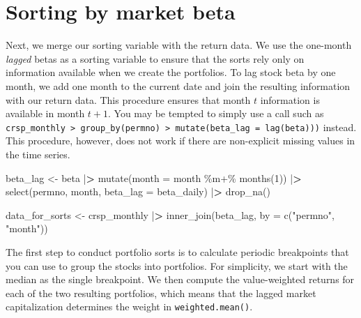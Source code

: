 \documentclass[
]{book}
\newenvironment{Shaded}{\begin{snugshade}}{\end{snugshade}}
\newcommand{\AttributeTok}[1]{\textcolor[rgb]{0.61,0.61,0.61}{#1}}
\newcommand{\DecValTok}[1]{\textcolor[rgb]{0.06,0.06,0.06}{#1}}
\newcommand{\ErrorTok}[1]{\textcolor[rgb]{0.14,0.14,0.14}{\textbf{#1}}}
\newcommand{\FunctionTok}[1]{\textcolor[rgb]{0,0,0}{#1}}
\newcommand{\NormalTok}[1]{#1}
\newcommand{\OtherTok}[1]{\textcolor[rgb]{0.37,0.37,0.37}{#1}}
\newcommand{\SpecialCharTok}[1]{\textcolor[rgb]{0,0,0}{#1}}
\newcommand{\StringTok}[1]{\textcolor[rgb]{0.5,0.5,0.5}{#1}}
\begin{document}
\hypertarget{sorting-by-market-beta}{%
\section{Sorting by market beta}\label{sorting-by-market-beta}}

Next, we merge our sorting variable with the return data. We use the one-month \emph{lagged} betas as a sorting variable to ensure that the sorts rely only on information available when we create the portfolios.
To lag stock beta by one month, we add one month to the current date and join the resulting information with our return data.
This procedure ensures that month \(t\) information is available in month \(t+1\).
You may be tempted to simply use a call such as \texttt{crsp\_monthly\ \textbar{}\textgreater{}\ group\_by(permno)\ \textbar{}\textgreater{}\ mutate(beta\_lag\ =\ lag(beta)))} instead.
This procedure, however, does not work if there are non-explicit missing values in the time series.

\begin{Shaded}
\begin{Highlighting}[]
\NormalTok{beta\_lag }\OtherTok{\textless{}{-}}\NormalTok{ beta }\SpecialCharTok{|}\ErrorTok{\textgreater{}}
  \FunctionTok{mutate}\NormalTok{(}\AttributeTok{month =}\NormalTok{ month }\SpecialCharTok{\%m+\%} \FunctionTok{months}\NormalTok{(}\DecValTok{1}\NormalTok{)) }\SpecialCharTok{|}\ErrorTok{\textgreater{}}
  \FunctionTok{select}\NormalTok{(permno, month, }\AttributeTok{beta\_lag =}\NormalTok{ beta\_daily) }\SpecialCharTok{|}\ErrorTok{\textgreater{}}
  \FunctionTok{drop\_na}\NormalTok{()}

\NormalTok{data\_for\_sorts }\OtherTok{\textless{}{-}}\NormalTok{ crsp\_monthly }\SpecialCharTok{|}\ErrorTok{\textgreater{}}
  \FunctionTok{inner\_join}\NormalTok{(beta\_lag, }\AttributeTok{by =} \FunctionTok{c}\NormalTok{(}\StringTok{"permno"}\NormalTok{, }\StringTok{"month"}\NormalTok{))}
\end{Highlighting}
\end{Shaded}

The first step to conduct portfolio sorts is to calculate periodic breakpoints that you can use to group the stocks into portfolios.
For simplicity, we start with the median as the single breakpoint.
We then compute the value-weighted returns for each of the two resulting portfolios, which means that the lagged market capitalization determines the weight in \texttt{weighted.mean()}.
\end{document}
